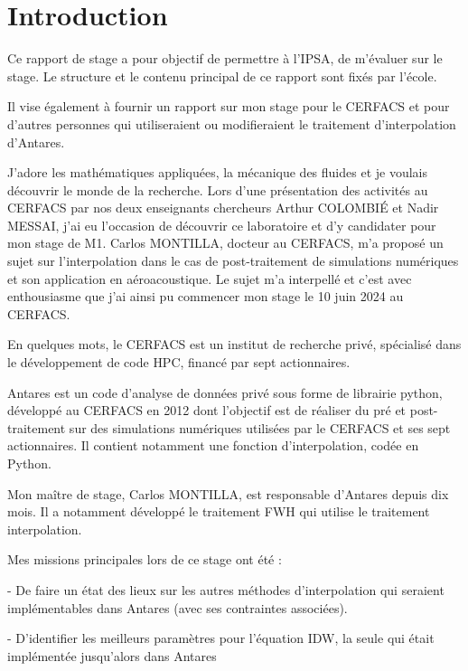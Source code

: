 \section*{Introduction}

Ce rapport de stage a pour objectif de permettre à l'IPSA, de m'évaluer sur le stage. Le structure et le contenu principal de ce rapport sont fixés par l'école.

Il vise également à fournir un rapport sur mon stage pour le CERFACS et pour d'autres personnes qui utiliseraient ou modifieraient le traitement d'interpolation d'Antares.

\vspace{0.5cm}

J'adore les mathématiques appliquées, la mécanique des fluides et je voulais découvrir le monde de la recherche. Lors d'une présentation des activités au \ac{CERFACS} par nos deux enseignants chercheurs Arthur COLOMBIÉ et Nadir MESSAI, j'ai eu l'occasion de découvrir ce laboratoire et d'y candidater pour mon stage de M1. Carlos MONTILLA, docteur au CERFACS, m'a proposé un sujet sur l'interpolation dans le cas de post-traitement de simulations numériques et son application en aéroacoustique. Le sujet m'a interpellé et c'est avec enthousiasme que j'ai ainsi pu commencer mon stage le 10 juin 2024 au CERFACS.

En quelques mots, le CERFACS est un institut de recherche privé, spécialisé dans le développement de code \ac{HPC}, financé par sept actionnaires.

Antares\cite{antares} est un code d’analyse de données privé sous forme de librairie python, développé au CERFACS en 2012 dont l'objectif est de réaliser du pré et post-traitement sur des simulations numériques utilisées par le CERFACS et ses sept actionnaires.
Il contient notamment une fonction d'interpolation, codée en Python.

Mon maître de stage, Carlos MONTILLA, est responsable d'Antares depuis dix mois. Il a notamment développé le traitement \ac{FWH} qui utilise le traitement interpolation.

Mes missions principales lors de ce stage ont été :

- De faire un état des lieux sur les autres méthodes d'interpolation qui seraient 
implémentables dans Antares (avec ses contraintes associées).

- D'identifier les meilleurs paramètres pour l'équation \ac{IDW}, la seule qui était implémentée jusqu'alors dans Antares %


